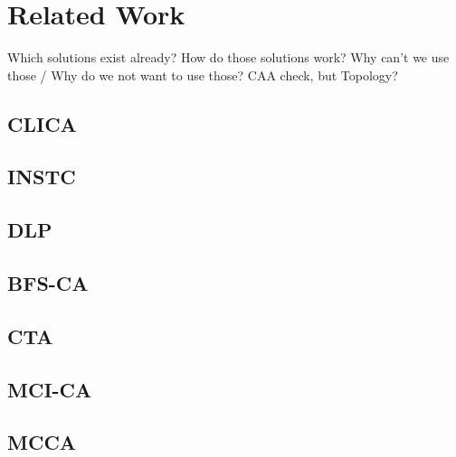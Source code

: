 \chapter{Related Work}
Which solutions exist already?\newline
How do those solutions work?\newline
Why can't we use those / Why do we not want to use those?\newline
CAA check, but Topology?\newline
\section{CLICA}
\section{INSTC}
\section{DLP}
\section{BFS-CA}
\section{CTA}
\section{MCI-CA}
\section{MCCA}
